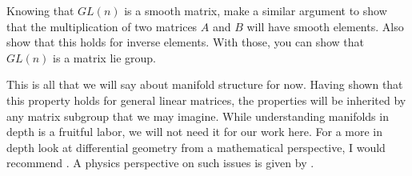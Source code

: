 \begin{exercise}
Knowing that $GL(n)$ is a smooth matrix, make a similar argument to show that the multiplication of two matrices $A$ and $B$ will have smooth elements. Also show that this holds for inverse elements. With those, you can show that $GL(n)$ is a matrix \gls{lie group}.
\end{exercise}

This is all that we will say about manifold structure for now. Having shown that this property holds for general linear matrices, the properties will be inherited by any matrix subgroup that we may imagine. While understanding manifolds in depth is a fruitful labor, we will not need it for our work here. For a more in depth look at differential geometry from a mathematical perspective, I would recommend \cite{carmo_differential_2016}. A physics perspective on such issues is given by \cite{susskind_general_2025}.

